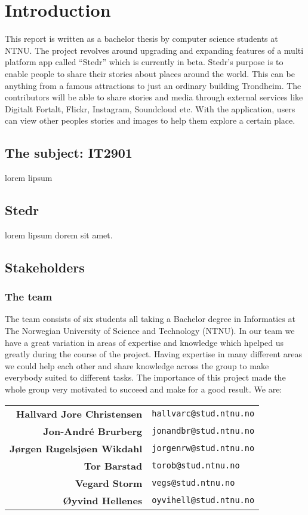 \section{Introduction}
	\setcounter{page}{1}


This report is written as a bachelor thesis by computer science students at NTNU. The project revolves around upgrading and expanding features of a multi platform app called “Stedr” which is currently in beta. Stedr's purpose is to enable people to share their stories about places around the world. This can be anything from a famous attractions to just an ordinary building Trondheim. The contributors will be able to share stories and media through external services like Digitalt Fortalt, Flickr, Instagram, Soundcloud etc. With the application, users can view other peoples stories and images  to help them explore a certain place.

\subsection{The subject: IT2901}
lorem lipsum

\subsection{Stedr}
lorem lipsum dorem sit amet.

\subsection{Stakeholders}

\subsubsection{The team}
The team consists of six students all taking a Bachelor degree in Informatics at The Norwegian University of Science and Technology (NTNU). In our team we have a great variation in areas of expertise and knowledge which hpelped us greatly during the course of the project. Having expertise in many different areas we could help each other and share knowledge across the group to make everybody suited to different tasks. The importance of this project made the whole group very motivated to succeed and make for a good result.
We are:\\

\begin{tabular}{r|p{11cm}}
\textbf{Hallvard Jore Christensen} & \texttt{hallvarc@stud.ntnu.no}\\[8pt]
\textbf{Jon-André Brurberg} & \texttt{jonandbr@stud.ntnu.no}\\[8pt]
\textbf{Jørgen Rugelsjøen Wikdahl} & \texttt{jorgenrw@stud.ntnu.no}\\[8pt]
\textbf{Tor Barstad} & \texttt{torob@stud.ntnu.no}\\[8pt]
\textbf{Vegard Storm} & \texttt{vegs@stud.ntnu.no}\\[8pt]
\textbf{Øyvind Hellenes} & \texttt{oyvihell@stud.ntnu.no}\\
\end{tabular}

